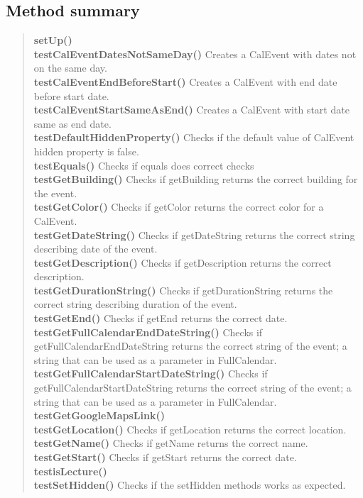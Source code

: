 \documentclass[11pt,a4paper]{report}
\begin{document}
{{\subsection{Method summary}{
\begin{verse}
{\bf setUp()} \\
{\bf testCalEventDatesNotSameDay()} Creates a CalEvent with dates not on the same day.\\
{\bf testCalEventEndBeforeStart()} Creates a CalEvent with end date before start date.\\
{\bf testCalEventStartSameAsEnd()} Creates a CalEvent with start date same as end date.\\
{\bf testDefaultHiddenProperty()} Checks if the default value of CalEvent hidden property is false.\\
{\bf testEquals()} Checks if equals does correct checks\\
{\bf testGetBuilding()} Checks if getBuilding returns the correct building for the event.\\
{\bf testGetColor()} Checks if getColor returns the correct color for a CalEvent.\\
{\bf testGetDateString()} Checks if getDateString returns the correct string describing date of the event.\\
{\bf testGetDescription()} Checks if getDescription returns the correct description.\\
{\bf testGetDurationString()} Checks if getDurationString returns the correct string describing duration of the event.\\
{\bf testGetEnd()} Checks if getEnd returns the correct date.\\
{\bf testGetFullCalendarEndDateString()} Checks if getFullCalendarEndDateString returns the correct string of the event; a string that can be used as a parameter in FullCalendar.\\
{\bf testGetFullCalendarStartDateString()} Checks if getFullCalendarStartDateString returns the correct string of the event; a string that can be used as a parameter in FullCalendar.\\
{\bf testGetGoogleMapsLink()} \\
{\bf testGetLocation()} Checks if getLocation returns the correct location.\\
{\bf testGetName()} Checks if getName returns the correct name.\\
{\bf testGetStart()} Checks if getStart returns the correct date.\\
{\bf testisLecture()} \\
{\bf testSetHidden()} Checks if the setHidden methods works as expected.\\
\end{verse}
}
}}
\end{document}
